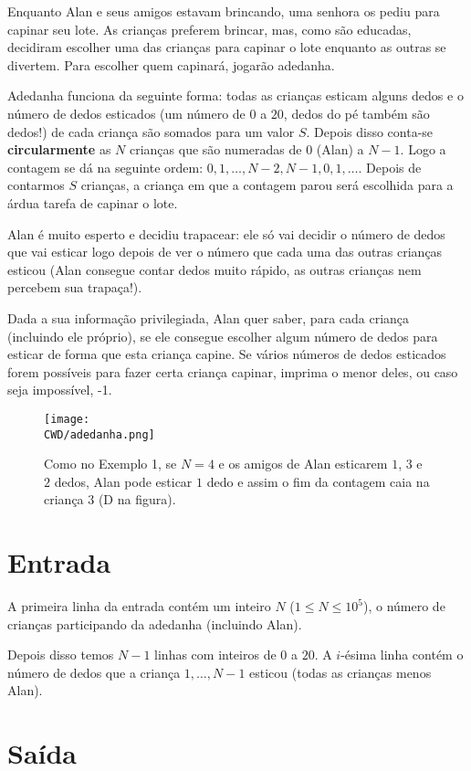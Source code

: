 Enquanto Alan e seus amigos estavam brincando, uma senhora os pediu para capinar seu lote. As crianças preferem brincar, mas, como são educadas, decidiram escolher uma das crianças para capinar o lote enquanto as outras se divertem. Para escolher quem capinará, jogarão adedanha.

Adedanha funciona da seguinte forma: todas as crianças esticam alguns dedos e o número de dedos esticados (um número de $0$ a $20$, dedos do pé também são dedos!) de cada criança são somados para um valor $S$. Depois disso conta-se \textbf{circularmente} as $N$ crianças que são numeradas de $0$ (Alan) a $N - 1$. Logo a contagem se dá na seguinte ordem: $0, 1, \ldots, N - 2, N - 1, 0, 1, \ldots$. Depois de contarmos $S$ crianças, a criança em que a contagem parou será escolhida para a árdua tarefa de capinar o lote.

Alan é muito esperto e decidiu trapacear: ele só vai decidir o número de dedos que vai esticar logo depois de ver o número que cada uma das outras crianças esticou (Alan consegue contar dedos muito rápido, as outras crianças nem percebem sua trapaça!).

Dada a sua informação privilegiada, Alan quer saber, para cada criança (incluindo ele próprio), se ele consegue escolher algum número de dedos para esticar de forma que esta criança capine. Se vários números de dedos esticados forem possíveis para fazer certa criança capinar, imprima o menor deles, ou caso seja impossível, -1.

\begin{figure}[H]
    \centering
    \texttt{[image: \\CWD/adedanha.png]}
    \caption{Como no Exemplo 1, se $N = 4$ e os amigos de Alan esticarem $1$, $3$ e $2$ dedos, Alan pode esticar $1$ dedo e assim o fim da contagem caia na criança $3$ (D na figura).}
\end{figure}

\section*{Entrada}

A primeira linha da entrada contém um inteiro $N$ ($1 \leq N \leq 10^5$), o número de crianças participando da adedanha (incluindo Alan).

Depois disso temos $N - 1$ linhas com inteiros de $0$ a $20$. A $i$-ésima linha contém o número de dedos que a criança $1,\ldots,N - 1$ esticou (todas as crianças menos Alan). 

\section*{Saída}

